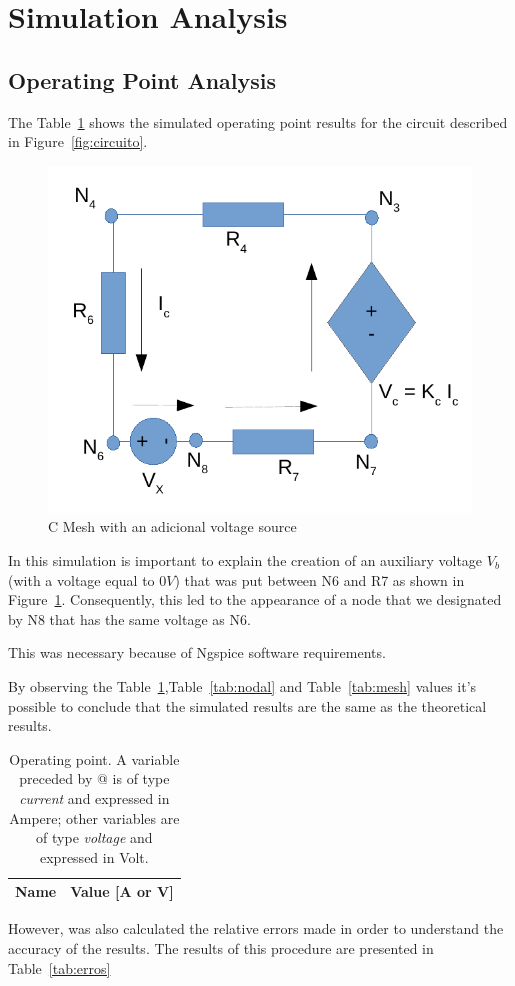 \section{Simulation Analysis}
\label{sec:simulation}

\subsection{Operating Point Analysis}


The Table~\ref{tab:op} shows the simulated operating point results for the circuit described in Figure~\ref{fig:circuito}.

\begin{figure}[h] \centering
\includegraphics[width=0.6\linewidth]{malhaC.pdf}
\caption{C Mesh with an adicional voltage source} %
\label{fig:malhaC}
\end{figure}

In this simulation is important to explain the creation of an auxiliary voltage $V_b$ (with a voltage equal to $0V$) that was put between N6 and R7 as shown in Figure~\ref{fig:malhaC}. Consequently, this led to the appearance of a node that we designated by N8 that has the same voltage as N6.

This was necessary because of Ngspice software requirements.

By observing the Table~\ref{tab:op},Table~\ref{tab:nodal} and Table~\ref{tab:mesh} values it's possible to conclude that the simulated results are the same as the theoretical results.%

\begin{table}[h]
  \centering
  \begin{tabular}{|l|r|}
    \hline    
    {\bf Name} & {\bf Value [A or V]} \\ \hline
    
  \end{tabular}
  \caption{Operating point. A variable preceded by @ is of type {\em current}
    and expressed in Ampere; other variables are of type {\it voltage} and expressed in
    Volt.}
  \label{tab:op}
\end{table}

However, was also calculated the relative errors made in order to understand the accuracy of the results. The results of this procedure are presented in Table~\ref{tab:erros}





